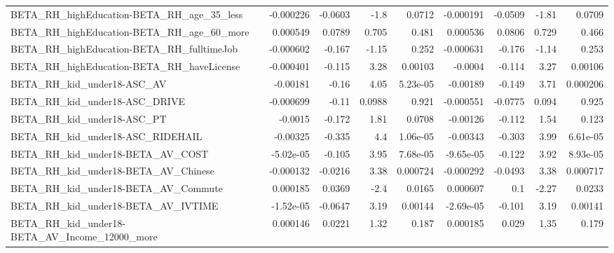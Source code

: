 \begin{tabular}{lrrrrrrrr}
BETA\_RH\_highEducation-BETA\_RH\_age\_35\_less          &   -0.000226 &      -0.0603 &      -1.8 &   0.0712 &  -0.000191 &     -0.0509 &        -1.81 &        0.0709 \\
BETA\_RH\_highEducation-BETA\_RH\_age\_60\_more          &    0.000549 &       0.0789 &     0.705 &    0.481 &   0.000536 &      0.0806 &        0.729 &         0.466 \\
BETA\_RH\_highEducation-BETA\_RH\_fulltimeJob          &   -0.000602 &       -0.167 &     -1.15 &    0.252 &  -0.000631 &      -0.176 &        -1.14 &         0.253 \\
BETA\_RH\_highEducation-BETA\_RH\_haveLicense          &   -0.000401 &       -0.115 &      3.28 &  0.00103 &    -0.0004 &      -0.114 &         3.27 &       0.00106 \\
BETA\_RH\_kid\_under18-ASC\_AV                         &    -0.00181 &        -0.16 &      4.05 & 5.23e-05 &   -0.00189 &      -0.149 &         3.71 &      0.000206 \\
BETA\_RH\_kid\_under18-ASC\_DRIVE                      &   -0.000699 &        -0.11 &    0.0988 &    0.921 &  -0.000551 &     -0.0775 &        0.094 &         0.925 \\
BETA\_RH\_kid\_under18-ASC\_PT                         &     -0.0015 &       -0.172 &      1.81 &   0.0708 &   -0.00126 &      -0.112 &         1.54 &         0.123 \\
BETA\_RH\_kid\_under18-ASC\_RIDEHAIL                   &    -0.00325 &       -0.335 &       4.4 & 1.06e-05 &   -0.00343 &      -0.303 &         3.99 &      6.61e-05 \\
BETA\_RH\_kid\_under18-BETA\_AV\_COST                   &   -5.02e-05 &       -0.105 &      3.95 & 7.68e-05 &  -9.65e-05 &      -0.122 &         3.92 &      8.93e-05 \\
BETA\_RH\_kid\_under18-BETA\_AV\_Chinese                &   -0.000132 &      -0.0216 &      3.38 & 0.000724 &  -0.000292 &     -0.0493 &         3.38 &      0.000717 \\
BETA\_RH\_kid\_under18-BETA\_AV\_Commute                &    0.000185 &       0.0369 &      -2.4 &   0.0165 &   0.000607 &         0.1 &        -2.27 &        0.0233 \\
BETA\_RH\_kid\_under18-BETA\_AV\_IVTIME                 &   -1.52e-05 &      -0.0647 &      3.19 &  0.00144 &  -2.69e-05 &      -0.101 &         3.19 &       0.00141 \\
BETA\_RH\_kid\_under18-BETA\_AV\_Income\_12000\_more      &    0.000146 &       0.0221 &      1.32 &    0.187 &   0.000185 &       0.029 &         1.35 &         0.179 \\

\end{tabular}
